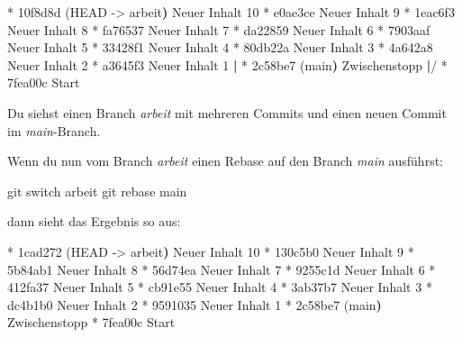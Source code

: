 \documentclass[
  letterpaper,
  DIV=11]{scrreprt}
\newenvironment{Shaded}{\begin{snugshade}}{\end{snugshade}}
\newcommand{\AttributeTok}[1]{\textcolor[rgb]{0.40,0.45,0.13}{#1}}
\newcommand{\ErrorTok}[1]{\textcolor[rgb]{0.68,0.00,0.00}{#1}}
\newcommand{\ExtensionTok}[1]{\textcolor[rgb]{0.00,0.23,0.31}{#1}}
\newcommand{\FunctionTok}[1]{\textcolor[rgb]{0.28,0.35,0.67}{#1}}
\newcommand{\KeywordTok}[1]{\textcolor[rgb]{0.00,0.23,0.31}{\textbf{#1}}}
\newcommand{\NormalTok}[1]{\textcolor[rgb]{0.00,0.23,0.31}{#1}}
\newcommand{\OperatorTok}[1]{\textcolor[rgb]{0.37,0.37,0.37}{#1}}
\newcommand{\branch}[1]{\textit{#1}\xspace}
\begin{document}
\begin{Shaded}
\begin{Highlighting}[]
\ExtensionTok{*}\NormalTok{ 10f8d8d }\ErrorTok{(}\ExtensionTok{HEAD} \AttributeTok{{-}}\OperatorTok{\textgreater{}}\NormalTok{ arbeit}\KeywordTok{)} \ExtensionTok{Neuer}\NormalTok{ Inhalt 10}
\ExtensionTok{*}\NormalTok{ e0ae3ce Neuer Inhalt 9}
\ExtensionTok{*}\NormalTok{ 1eac6f3 Neuer Inhalt 8}
\ExtensionTok{*}\NormalTok{ fa76537 Neuer Inhalt 7}
\ExtensionTok{*}\NormalTok{ da22859 Neuer Inhalt 6}
\ExtensionTok{*}\NormalTok{ 7903aaf Neuer Inhalt 5}
\ExtensionTok{*}\NormalTok{ 33428f1 Neuer Inhalt 4}
\ExtensionTok{*}\NormalTok{ 80db22a Neuer Inhalt 3}
\ExtensionTok{*}\NormalTok{ 4a642a8 Neuer Inhalt 2}
\ExtensionTok{*}\NormalTok{ a3645f3 Neuer Inhalt 1}
\KeywordTok{|} \ExtensionTok{*}\NormalTok{ 2c58be7 }\ErrorTok{(}\ExtensionTok{main}\KeywordTok{)} \ExtensionTok{Zwischenstopp}
\KeywordTok{|}\ExtensionTok{/}  
\ExtensionTok{*}\NormalTok{ 7fea00c Start}
\end{Highlighting}
\end{Shaded}

Du siehst einen Branch \branch{arbeit} mit mehreren Commits und einen
neuen Commit im \branch{main}-Branch.

Wenn du nun vom Branch \branch{arbeit} einen Rebase auf den Branch
\branch{main} ausführst:

\begin{Shaded}
\begin{Highlighting}[]
\FunctionTok{git}\NormalTok{ switch arbeit }
\FunctionTok{git}\NormalTok{ rebase main }
\end{Highlighting}
\end{Shaded}

dann sieht das Ergebnis so aus:

\begin{Shaded}
\begin{Highlighting}[]
\ExtensionTok{*}\NormalTok{ 1cad272 }\ErrorTok{(}\ExtensionTok{HEAD} \AttributeTok{{-}}\OperatorTok{\textgreater{}}\NormalTok{ arbeit}\KeywordTok{)} \ExtensionTok{Neuer}\NormalTok{ Inhalt 10}
\ExtensionTok{*}\NormalTok{ 130c5b0 Neuer Inhalt 9}
\ExtensionTok{*}\NormalTok{ 5b84ab1 Neuer Inhalt 8}
\ExtensionTok{*}\NormalTok{ 56d74ea Neuer Inhalt 7}
\ExtensionTok{*}\NormalTok{ 9255c1d Neuer Inhalt 6}
\ExtensionTok{*}\NormalTok{ 412fa37 Neuer Inhalt 5}
\ExtensionTok{*}\NormalTok{ cb91e55 Neuer Inhalt 4}
\ExtensionTok{*}\NormalTok{ 3ab37b7 Neuer Inhalt 3}
\ExtensionTok{*}\NormalTok{ dc4b1b0 Neuer Inhalt 2}
\ExtensionTok{*}\NormalTok{ 9591035 Neuer Inhalt 1}
\ExtensionTok{*}\NormalTok{ 2c58be7 }\ErrorTok{(}\ExtensionTok{main}\KeywordTok{)} \ExtensionTok{Zwischenstopp}
\ExtensionTok{*}\NormalTok{ 7fea00c Start}
\end{Highlighting}
\end{Shaded}
\end{document}
